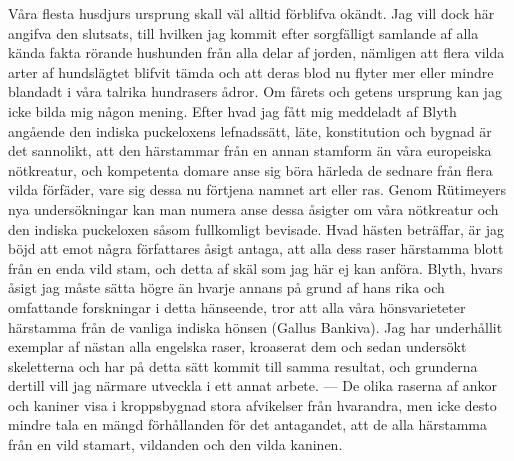 Våra flesta husdjurs ursprung skall väl alltid förblifva okändt. Jag vill dock här angifva den slutsats, till hvilken jag kommit efter sorgfälligt samlande af alla kända fakta rörande hushunden från alla delar af jorden, nämligen att flera vilda arter af hundslägtet blifvit tämda och att deras blod nu flyter mer eller mindre blandadt i våra talrika hundrasers ådror. Om fårets och getens ursprung kan jag icke bilda mig någon mening. Efter hvad jag fått mig meddeladt af Blyth angående den indiska puckeloxens lefnadssätt, läte, konstitution och bygnad är det sannolikt, att den härstammar från en annan stamform än våra europeiska nötkreatur, och kompetenta domare anse sig böra härleda de sednare från flera vilda förfäder, vare sig dessa nu förtjena namnet art eller ras. Genom Rütimeyers nya undersökningar kan man numera anse dessa åsigter om våra nötkreatur och den indiska puckeloxen såsom fullkomligt bevisade. Hvad hästen beträffar, är jag böjd att emot några författares åsigt antaga, att alla dess raser härstamma blott från en enda vild stam, och detta af skäl som jag här ej kan anföra. Blyth, hvars åsigt jag måste sätta högre än hvarje annans på grund af hans rika och omfattande forskningar i detta hänseende, tror att alla våra hönsvarieteter härstamma från de vanliga indiska hönsen (Gallus Bankiva). Jag har underhållit exemplar af nästan alla engelska raser, kroaserat dem och sedan undersökt skeletterna och har på detta sätt kommit till samma resultat, och grunderna dertill vill jag närmare utveckla i ett annat arbete. — De olika raserna af ankor och kaniner visa i kroppsbygnad stora afvikelser från hvarandra, men icke desto mindre tala en mängd förhållanden för det antagandet, att de alla härstamma från en vild stamart, vildanden och den vilda kaninen.

